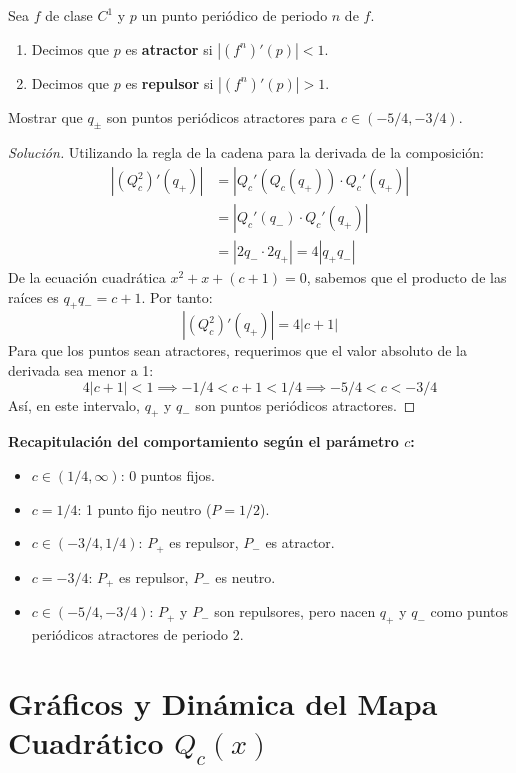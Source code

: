 \begin{definicion}
	Sea $f$ de clase $C^1$ y $p$ un punto periódico de periodo $n$ de $f$.
	\begin{enumerate}[1)]
		\item Decimos que $p$ es \textbf{atractor} si $|(f^n)'(p)| < 1$.
		\item Decimos que $p$ es \textbf{repulsor} si $|(f^n)'(p)| > 1$.
	\end{enumerate}
\end{definicion}

\begin{ejercicio}
	Mostrar que $q_\pm$ son puntos periódicos atractores para $c \in (-5/4, -3/4)$.
\end{ejercicio}
\begin{proof}[Solución]
	Utilizando la regla de la cadena para la derivada de la composición:
	\begin{align*}
		|(Q_c^2)'(q_+)| &= |Q_c'(Q_c(q_+)) \cdot Q_c'(q_+)| \\
		&= |Q_c'(q_-) \cdot Q_c'(q_+)| \\
		&= |2q_- \cdot 2q_+| = 4 |q_+ q_-|
	\end{align*}
	De la ecuación cuadrática $x^2 + x + (c+1) = 0$, sabemos que el producto de las raíces es $q_+ q_- = c+1$. Por tanto:
	$$ |(Q_c^2)'(q_+)| = 4|c+1| $$
	Para que los puntos sean atractores, requerimos que el valor absoluto de la derivada sea menor a 1:
	$$ 4|c+1| < 1 \implies -1/4 < c+1 < 1/4 \implies -5/4 < c < -3/4 $$
	Así, en este intervalo, $q_+$ y $q_-$ son puntos periódicos atractores.
\end{proof}

\textbf{Recapitulación del comportamiento según el parámetro $c$:}
\begin{itemize}
	\item $c \in (1/4, \infty)$: 0 puntos fijos.
	\item $c = 1/4$: 1 punto fijo neutro ($P = 1/2$).
	\item $c \in (-3/4, 1/4)$: $P_+$ es repulsor, $P_-$ es atractor.
	\item $c = -3/4$: $P_+$ es repulsor, $P_-$ es neutro.
	\item $c \in (-5/4, -3/4)$: $P_+$ y $P_-$ son repulsores, pero nacen $q_+$ y $q_-$ como puntos periódicos atractores de periodo 2.
\end{itemize}

\section{Gráficos y Dinámica del Mapa Cuadrático \texorpdfstring{$Q_c(x)$}{Q\_c(x)}}

